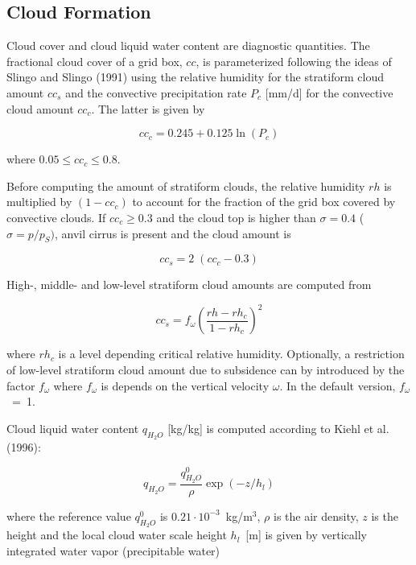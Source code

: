 \subsection{Cloud Formation}
Cloud cover and cloud liquid water content are
diagnostic quantities. The fractional cloud cover
of a grid box, $cc$, is parameterized following the ideas of Slingo and Slingo (1991) using the
relative humidity for the stratiform cloud amount $cc_s$ and the convective precipitation rate
$P_{c}$ [mm/d] for the convective cloud amount $cc_c$. The latter is given by

\begin{equation}
cc_c= 0.245 + 0.125 \ln{(P_c)}
\end{equation}

where $0.05 \le cc_c \le 0.8$.

Before computing the amount of stratiform clouds, the relative humidity $rh$ is multiplied by
$(1-cc_c)$ to account for the fraction of the grid box covered by convective clouds. If $cc_c \ge
0.3$ and the cloud top is higher than $\sigma = 0.4$ ($\sigma=p/p_S)$, anvil cirrus is present
and the cloud amount is   

\begin{equation}
cc_s=2\; (cc_c-0.3)
\end{equation}

High-, middle- and low-level stratiform cloud amounts are computed from

\begin{equation}
cc_s=f_{\omega} \left(\frac{rh-rh_c}{1-rh_c}\right)^2
\end{equation}

where $rh_c$ is a level depending critical relative
humidity. Optionally, a restriction of  low-level stratiform cloud amount due to subsidence can
by introduced by the factor $f_{\omega}$ where $f_{\omega}$ is depends on the vertical
velocity
$\omega$. In the default version, $f_{\omega}$~=~1. 

Cloud liquid water content $q_{H_2O}$ [kg/kg] is computed according to Kiehl et al. (1996):
 
\begin{equation}
q_{H_2O} = \frac{q^0_{H_2O}}{\rho} \exp{(-z/h_l)}
\end{equation}

where the reference value $q^0_{H_2O}$ is $0.21\cdot 10^{-3}$~kg/m$^3$, $\rho$ is the air
density, $z$ is the height
and the local cloud water scale height $h_l$~[m] is given by vertically integrated water vapor
(precipitable water)

